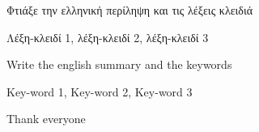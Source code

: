 \begin{abstractgr}
	\todo Φτιάξε την ελληνική περίληψη και τις λέξεις κλειδιά
\begin{keywordsgr}
  	Λέξη-κλειδί 1, λέξη-κλειδί 2, λέξη-κλειδί 3
\end{keywordsgr}
\end{abstractgr}

\begin{abstracten}
	\todo Write the english summary and the keywords
\begin{keywordsen}
  	Key-word 1, Key-word 2, Key-word 3
\end{keywordsen}
\end{abstracten}

\begin{acknowledgementsgr}
	\todo Thank everyone
\end{acknowledgementsgr}



